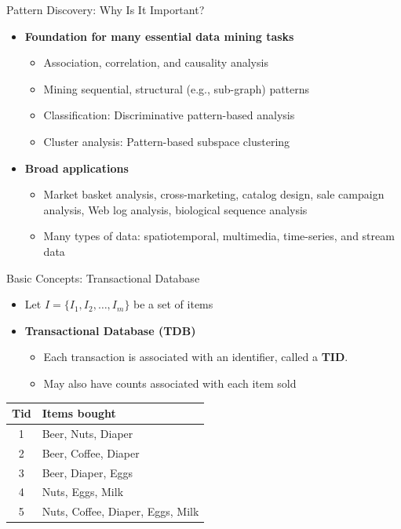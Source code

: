 \documentclass[aspectratio=169, 11pt]{beamer}
\begin{document}
\begin{frame}{Pattern Discovery: Why Is It Important?}
    \begin{itemize}
        \item \textbf{Foundation for many essential data mining tasks}
        \begin{itemize}
            \item Association, correlation, and causality analysis
            \item Mining sequential, structural (e.g., sub-graph) patterns
            \item Classification: Discriminative pattern-based analysis
            \item Cluster analysis: Pattern-based subspace clustering
        \end{itemize}
        \vspace{2mm}
        \item \textbf{Broad applications}
        \begin{itemize}
            \item Market basket analysis, cross-marketing, catalog design, sale campaign analysis, Web log analysis, biological sequence analysis
            \item Many types of data: spatiotemporal, multimedia, time-series, and stream data
        \end{itemize}
    \end{itemize}
\end{frame}

\begin{frame}{Basic Concepts: Transactional Database}
    \begin{itemize}
        \item Let $I = \{I_1, I_2, \dots, I_m\}$ be a set of items
        \item \textbf{Transactional Database (TDB)}
        \begin{itemize}
            \item Each transaction is associated with an identifier, called a \textbf{TID}.
            \item May also have counts associated with each item sold
        \end{itemize}
    \end{itemize}
    \vspace{3mm}
    \centering
    \begin{tabular}{cl}
        \toprule
        \textbf{Tid} & \textbf{Items bought} \\
        \midrule
        1 & Beer, Nuts, Diaper \\
        2 & Beer, Coffee, Diaper \\
        3 & Beer, Diaper, Eggs \\
        4 & Nuts, Eggs, Milk \\
        5 & Nuts, Coffee, Diaper, Eggs, Milk \\
        \bottomrule
    \end{tabular}
\end{frame}
\end{document}
